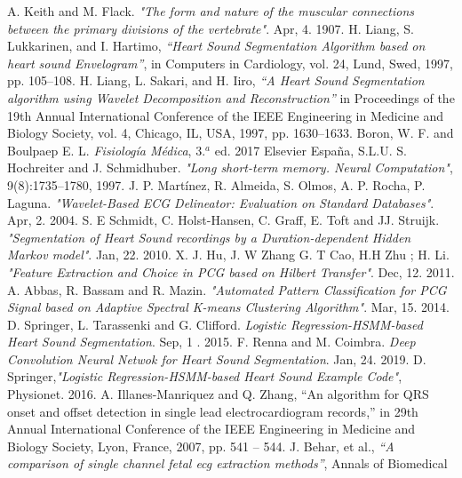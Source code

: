 \begin{thebibliography}{9}
  A. Keith and M. Flack. \textit{"The form and nature of the muscular connections between the primary divisions of the
  vertebrate"}. Apr, 4. 1907.
  H. Liang, S. Lukkarinen, and I. Hartimo, \textit{“Heart Sound Segmentation Algorithm based on heart sound
  Envelogram”}, in Computers in Cardiology, vol. 24, Lund, Swed, 1997, pp. 105–108.
  H. Liang, L. Sakari, and H. Iiro, \textit{“A Heart Sound Segmentation algorithm using Wavelet Decomposition and
  Reconstruction”} in Proceedings of the 19th Annual International Conference of the IEEE Engineering in Medicine and
  Biology Society, vol. 4, Chicago, IL, USA, 1997, pp. 1630–1633.
  Boron, W. F. and Boulpaep E. L. \textit{Fisiología Médica}, 3.$^a$ ed. 2017 Elsevier España, S.L.U.
  S. Hochreiter and J. Schmidhuber. \textit{"Long short-term memory. Neural Computation"}, 9(8):1735–1780, 1997.
  J. P. Martínez, R. Almeida, S. Olmos, A. P. Rocha, P. Laguna. \textit{"Wavelet-Based ECG Delineator: Evaluation on
  Standard Databases"}. Apr, 2. 2004.
  S. E Schmidt, C. Holst-Hansen, C. Graff, E. Toft and JJ. Struijk. \textit{"Segmentation of Heart Sound recordings by
  a Duration-dependent Hidden Markov model"}. Jan, 22. 2010.
  X. J.  Hu,  J. W Zhang  G. T Cao,  H.H Zhu ;  H. Li. \textit{"Feature Extraction and Choice in PCG based on Hilbert
  Transfer"}. Dec, 12. 2011.
  A. Abbas, R. Bassam and R. Mazin. \textit{"Automated Pattern Classification for PCG Signal based on Adaptive
  Spectral K-means Clustering Algorithm"}. Mar, 15. 2014.
  D. Springer, L. Tarassenki and G. Clifford. \textit{Logistic Regression-HSMM-based Heart Sound Segmentation}. Sep, 1
  . 2015.
  F. Renna and M. Coimbra. \textit{Deep Convolution Neural Netwok for Heart Sound Segmentation}. Jan, 24. 2019.
  D. Springer,\textit{"Logistic Regression-HSMM-based Heart Sound Example Code"}, Physionet. 2016.
  A. Illanes-Manriquez and Q. Zhang, “An algorithm for QRS onset and
  offset detection in single lead electrocardiogram records,” in 29th Annual International Conference of the IEEE
  Engineering in Medicine and Biology Society, Lyon, France, 2007, pp. 541 – 544.
  J. Behar, et al., \textit{“A comparison of single channel fetal ecg extraction methods”}, Annals of Biomedical

\end{thebibliography}
